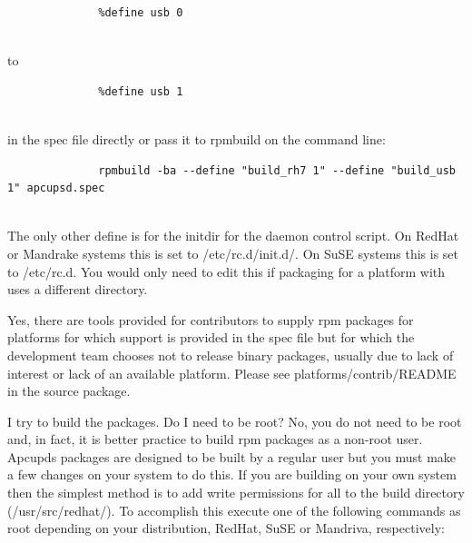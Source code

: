{{{{{{{{{{{{\begin{description}
\footnotesize
\begin{verbatim}
              %define usb 0
     
\end{verbatim}
\normalsize

to  

\footnotesize
\begin{verbatim}
              %define usb 1
     
\end{verbatim}
\normalsize

in the spec file directly or pass it to rpmbuild on the command line:  

\footnotesize
\begin{verbatim}
              rpmbuild -ba --define "build_rh7 1" --define "build_usb 1" apcupsd.spec
     
\end{verbatim}
\normalsize


\item [{\bf What other defines are used?}]
   The only other define is for the initdir for the daemon control script. On
RedHat or Mandrake systems this is set to /etc/rc.d/init.d/. On SuSE systems this is 
set to /etc/rc.d.  You would only need to edit
this if packaging for a platform with uses a different directory.  

\item [{\bf Can I supply packages for other platforms you do not publish?}]
   Yes, there are tools provided for contributors to supply rpm packages for platforms 
for which support is provided in the spec file but for which the development team 
chooses not to release binary packages, usually due to lack of interest or lack of an 
available platform. Please see platforms/contrib/README in the source package.  

\item [{\bf I'm getting errors about not having permission when}]
   I try to build the packages.  Do I need to be root? No, you do not need to be
root and, in fact, it is better practice to build rpm packages as a non-root
user.  Apcupds packages are designed to be built by a regular user but you
must make a few changes on your system to do this.  If you are building on
your own system then the simplest method is to add write permissions for all
to the build directory (/usr/src/redhat/).  To accomplish this execute one of the
following commands as root depending on your distribution, RedHat, SuSE or 
Mandriva, respectively:  


\end{description}}}}}}}}}}}}}
